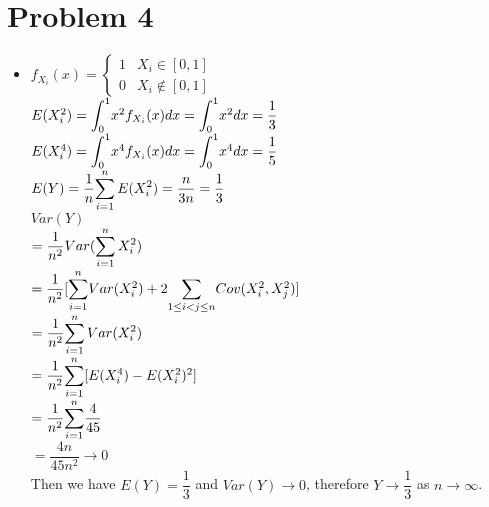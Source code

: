 \documentclass{article}
\begin{document}
\section*{Problem 4}
\begin{itemize}
	\item [] $f_{X_i}(x)=\begin{cases}1&X_i\in[0,1]\\0&X_i\notin[0,1]\end{cases}$\\$E(X_i^2)=\mathlarger{\int_0^1} x^2f_{X_i}(x)dx=\mathlarger{\int_0^1}x^2dx=\dfrac{1}{3}$\\$E(X_i^4)=\mathlarger{\int_0^1} x^4f_{X_i}(x)dx=\mathlarger{\int_0^1}x^4dx=\dfrac{1}{5}$\\$E(Y)=\dfrac{1}{n}\mathlarger{\sum_{i=1}^n E(X_i^2)}=\dfrac{n}{3n}=\dfrac{1}{3}$\\$Var(Y)$\\$=\dfrac{1}{n^2}Var(\mathlarger{\sum_{i=1}^n X_i^2})$\\$=\dfrac{1}{n^2}[\mathlarger{\sum_{i=1}^n} Var(X_i^2)+2\mathlarger{\sum_{1\leq i<j\leq n}}Cov(X_i^2,X_j^2)]$\\$=\dfrac{1}{n^2}\mathlarger{\sum_{i=1}^n Var(X_i^2)}$\\$=\dfrac{1}{n^2}\mathlarger{\sum_{i=1}^n} [E(X_i^4)-E(X_i^2)^2]$\\$=\dfrac{1}{n^2}\mathlarger{\sum_{i=1}^n}\dfrac{4}{45}$\\$=\dfrac{4n}{45n^2}\rightarrow 0$\\Then we have $E(Y)=\dfrac{1}{3}$ and $Var(Y)\rightarrow 0$, therefore $\boxed{Y\rightarrow\dfrac{1}{3}}$ as $n\rightarrow\infty$.
\end{itemize}
\end{document}
